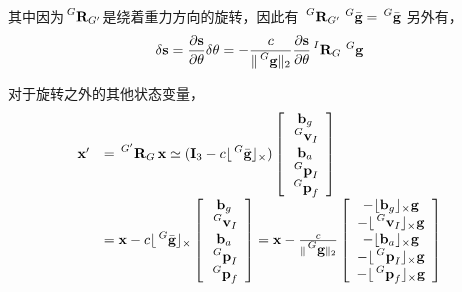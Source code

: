 \documentclass{article}
\begin{document}
其中因为$\sideset{^{G}}{}{\mathop{\textbf{R}_{G'}}}$是绕着重力方向的旋转，因此有
$\sideset{^G}{}{\mathop{\textbf{R}_{G'}}}\sideset{^G}{}{\mathop{\bar{\textbf{g}}}}=\sideset{^G}{}{\mathop{\bar{\textbf{g}}}}$
另外有，
\begin{equation}
    \delta\textbf{s}=\frac{\partial\textbf{s}}{\partial\mathbf{\theta}}\delta\mathbf{\theta}
    =-\frac{c}{\lVert\sideset{^G}{}{\mathop{\textbf{g}}}\rVert_2}\frac{\partial\textbf{s}}{\partial\mathbf{\theta}}
    \sideset{^I}{}{\mathop{\textbf{R}_{G}}}\sideset{^G}{}{\mathop{\textbf{g}}}
\end{equation}

\par
对于旋转之外的其他状态变量，
\begin{equation}
    \begin{array}{ll}
        \textbf{x}'&=\sideset{^{G'}}{}{\mathop{\textbf{R}_G}}\textbf{x}
        \simeq (\textbf{I}_3-c\lfloor\sideset{^G}{}{\mathop{\bar{\textbf{g}}}}\rfloor_{\times})
        \left[\begin{array}{c}\textbf{b}_{g}\\\sideset{^G}{}{\mathop{\textbf{v}_{I}}}\\
            \textbf{b}_{a}\\\sideset{^G}{}{\mathop{\textbf{p}_{I}}}\\
            \sideset{^G}{}{\mathop{\textbf{p}_{f}}}
        \end{array}\right]\\
        &=\textbf{x}-c\lfloor\sideset{^G}{}{\mathop{\bar{\textbf{g}}}}\rfloor_{\times}
        \left[\begin{array}{c}\textbf{b}_{g}\\\sideset{^G}{}{\mathop{\textbf{v}_{I}}}\\
            \textbf{b}_{a}\\\sideset{^G}{}{\mathop{\textbf{p}_{I}}}\\
            \sideset{^G}{}{\mathop{\textbf{p}_{f}}}
        \end{array}\right]
        =\textbf{x}-\frac{c}{\lVert\sideset{^G}{}{\mathop{\textbf{g}}}\rVert_2}
        \left[\begin{array}{c}-\lfloor\textbf{b}_{g}\rfloor_{\times}\textbf{g}\\
            -\lfloor\sideset{^G}{}{\mathop{\textbf{v}_{I}}}\rfloor_{\times}\textbf{g}\\
            -\lfloor\textbf{b}_{a}\rfloor_{\times}\textbf{g}\\
            -\lfloor\sideset{^G}{}{\mathop{\textbf{p}_{I}}}\rfloor_{\times}\textbf{g}\\
            -\lfloor\sideset{^G}{}{\mathop{\textbf{p}_{f}}}\rfloor_{\times}\textbf{g}
        \end{array}\right]\\
    \end{array}
\end{equation}
\end{document}
